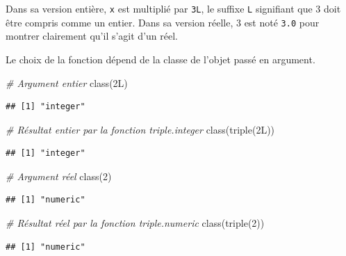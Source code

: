 \documentclass[
  11pt,
  french,
  a4paper,
  extrafontsizes,onecolumn,openright
  ]{memoir}
\newenvironment{Shaded}{\begin{snugshade}}{\end{snugshade}}
\newcommand{\CommentTok}[1]{\textcolor[rgb]{0.56,0.35,0.01}{\textit{#1}}}
\newcommand{\DecValTok}[1]{\textcolor[rgb]{0.00,0.00,0.81}{#1}}
\newcommand{\FunctionTok}[1]{\textcolor[rgb]{0.00,0.00,0.00}{#1}}
\newcommand{\NormalTok}[1]{#1}
\begin{document}
\normalsize

Dans sa version entière, \texttt{x} est multiplié par \texttt{3L}, le suffixe \texttt{L} signifiant que 3 doit être compris comme un entier.
Dans sa version réelle, 3 est noté \texttt{3.0} pour montrer clairement qu'il s'agit d'un réel.

Le choix de la fonction dépend de la classe de l'objet passé en argument.

\scriptsize

\begin{Shaded}
\begin{Highlighting}[]
\CommentTok{\# Argument entier}
\FunctionTok{class}\NormalTok{(2L)}
\end{Highlighting}
\end{Shaded}

\begin{verbatim}
## [1] "integer"
\end{verbatim}

\begin{Shaded}
\begin{Highlighting}[]
\CommentTok{\# Résultat entier par la fonction triple.integer}
\FunctionTok{class}\NormalTok{(}\FunctionTok{triple}\NormalTok{(2L))}
\end{Highlighting}
\end{Shaded}

\begin{verbatim}
## [1] "integer"
\end{verbatim}

\begin{Shaded}
\begin{Highlighting}[]
\CommentTok{\# Argument réel}
\FunctionTok{class}\NormalTok{(}\DecValTok{2}\NormalTok{)}
\end{Highlighting}
\end{Shaded}

\begin{verbatim}
## [1] "numeric"
\end{verbatim}

\begin{Shaded}
\begin{Highlighting}[]
\CommentTok{\# Résultat réel par la fonction triple.numeric}
\FunctionTok{class}\NormalTok{(}\FunctionTok{triple}\NormalTok{(}\DecValTok{2}\NormalTok{))}
\end{Highlighting}
\end{Shaded}

\begin{verbatim}
## [1] "numeric"
\end{verbatim}
\end{document}
